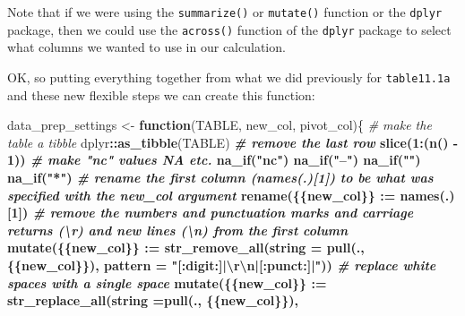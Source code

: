 \documentclass[
]{article}
\newenvironment{Shaded}{\begin{snugshade}}{\end{snugshade}}
\newcommand{\CharTok}[1]{\textcolor[rgb]{0.31,0.60,0.02}{#1}}
\newcommand{\CommentTok}[1]{\textcolor[rgb]{0.56,0.35,0.01}{\textit{#1}}}
\newcommand{\ControlFlowTok}[1]{\textcolor[rgb]{0.13,0.29,0.53}{\textbf{#1}}}
\newcommand{\DataTypeTok}[1]{\textcolor[rgb]{0.13,0.29,0.53}{#1}}
\newcommand{\DecValTok}[1]{\textcolor[rgb]{0.00,0.00,0.81}{#1}}
\newcommand{\ErrorTok}[1]{\textcolor[rgb]{0.64,0.00,0.00}{\textbf{#1}}}
\newcommand{\KeywordTok}[1]{\textcolor[rgb]{0.13,0.29,0.53}{\textbf{#1}}}
\newcommand{\NormalTok}[1]{#1}
\newcommand{\OperatorTok}[1]{\textcolor[rgb]{0.81,0.36,0.00}{\textbf{#1}}}
\newcommand{\StringTok}[1]{\textcolor[rgb]{0.31,0.60,0.02}{#1}}
\begin{document}
Note that if we were using the \texttt{summarize()} or \texttt{mutate()}
function or the \texttt{dplyr} package, then we could use the
\texttt{across()} function of the \texttt{dplyr} package to select what
columns we wanted to use in our calculation.

OK, so putting everything together from what we did previously for
\texttt{table11.1a} and these new flexible steps we can create this
function:

\begin{Shaded}
\begin{Highlighting}[]
\NormalTok{data_prep_settings <-}\StringTok{ }\ControlFlowTok{function}\NormalTok{(TABLE, new_col, pivot_col)\{}
\CommentTok{# make the table a tibble}
\NormalTok{  dplyr}\OperatorTok{::}\KeywordTok{as_tibble}\NormalTok{(TABLE) }\OperatorTok{%>%}
\CommentTok{# remove the last row}
\StringTok{    }\KeywordTok{slice}\NormalTok{(}\DecValTok{1}\OperatorTok{:}\NormalTok{(}\KeywordTok{n}\NormalTok{() }\OperatorTok{-}\StringTok{ }\DecValTok{1}\NormalTok{)) }\OperatorTok{%>%}
\CommentTok{# make "nc" values NA etc.}
\StringTok{    }\KeywordTok{na_if}\NormalTok{(}\StringTok{"nc"}\NormalTok{) }\OperatorTok{%>%}
\StringTok{    }\KeywordTok{na_if}\NormalTok{(}\StringTok{"--"}\NormalTok{) }\OperatorTok{%>%}
\StringTok{    }\KeywordTok{na_if}\NormalTok{(}\StringTok{""}\NormalTok{) }\OperatorTok{%>%}
\StringTok{    }\KeywordTok{na_if}\NormalTok{(}\StringTok{"*"}\NormalTok{) }\OperatorTok{%>%}\StringTok{ }
\CommentTok{# rename the first column (names(.)[1]) to be what was specified with the new_col argument}
\StringTok{    }\KeywordTok{rename}\NormalTok{(\{\{new_col\}\} }\OperatorTok{:}\ErrorTok{=}\StringTok{ }\KeywordTok{names}\NormalTok{(.)[}\DecValTok{1}\NormalTok{]) }\OperatorTok{%>%}
\CommentTok{# remove the numbers and punctuation marks and carriage returns (\textbackslash{}r) and new lines (\textbackslash{}n) from the first column}
\StringTok{    }\KeywordTok{mutate}\NormalTok{(\{\{new_col\}\} }\OperatorTok{:}\ErrorTok{=}\StringTok{ }
\StringTok{        }\KeywordTok{str_remove_all}\NormalTok{(}\DataTypeTok{string =} \KeywordTok{pull}\NormalTok{(., \{\{new_col\}\}), }
                        \DataTypeTok{pattern =} \StringTok{"[:digit:]|}\CharTok{\textbackslash{}r\textbackslash{}n}\StringTok{|[:punct:]|"}\NormalTok{)) }\OperatorTok{%>%}
\CommentTok{# replace white spaces with a single space}
\StringTok{    }\KeywordTok{mutate}\NormalTok{(\{\{new_col\}\} }\OperatorTok{:}\ErrorTok{=}\StringTok{ }
\StringTok{        }\KeywordTok{str_replace_all}\NormalTok{(}\DataTypeTok{string =}\KeywordTok{pull}\NormalTok{(., \{\{new_col\}\}),}
}}}}}}}}
\end{Highlighting}
\end{Shaded}
\end{document}

